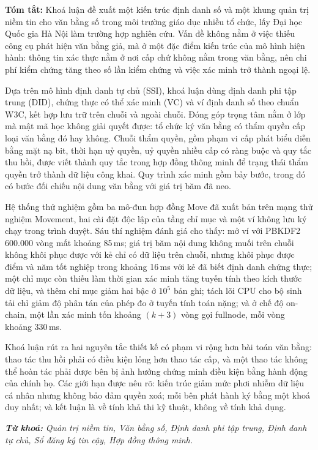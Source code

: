 
{\fsize{12pt}
\textbf{Tóm tắt:} Khoá luận đề xuất một kiến trúc định danh số và một khung quản trị niềm tin cho văn bằng số trong môi trường giáo dục nhiều tổ chức, lấy Đại học Quốc gia Hà Nội làm trường hợp nghiên cứu. Vấn đề không nằm ở việc thiếu công cụ phát hiện văn bằng giả, mà ở một đặc điểm kiến trúc của mô hình hiện hành: thông tin xác thực nằm ở nơi cấp chứ không nằm trong văn bằng, nên chi phí kiểm chứng tăng theo số lần kiểm chứng và việc xác minh trở thành ngoại lệ.

Dựa trên mô hình định danh tự chủ (SSI), khoá luận dùng định danh phi tập trung (DID), chứng thực có thể xác minh (VC) và ví định danh số theo chuẩn W3C, kết hợp lưu trữ trên chuỗi và ngoài chuỗi. Đóng góp trọng tâm nằm ở lớp mà mật mã học không giải quyết được: tổ chức ký văn bằng có thẩm quyền cấp loại văn bằng đó hay không. Chuỗi thẩm quyền, gồm phạm vi cấp phát biểu diễn bằng mặt nạ bit, thời hạn uỷ quyền, uỷ quyền nhiều cấp có ràng buộc và quy tắc thu hồi, được viết thành quy tắc trong hợp đồng thông minh để trạng thái thẩm quyền trở thành dữ liệu công khai. Quy trình xác minh gồm bảy bước, trong đó có bước đối chiếu nội dung văn bằng với giá trị băm đã neo.

Hệ thống thử nghiệm gồm ba mô-đun hợp đồng Move đã xuất bản trên mạng thử nghiệm Movement, hai cài đặt độc lập của tầng chỉ mục và một ví không lưu ký chạy trong trình duyệt. Sáu thí nghiệm đánh giá cho thấy: mở ví với PBKDF2 600.000 vòng mất khoảng 85\,ms; giá trị băm nội dung không muối trên chuỗi không khôi phục được với kẻ chỉ có dữ liệu trên chuỗi, nhưng khôi phục được điểm và năm tốt nghiệp trong khoảng 16\,ms với kẻ đã biết định danh chứng thực; một chỉ mục còn thiếu làm thời gian xác minh tăng tuyến tính theo kích thước dữ liệu, và thêm chỉ mục giảm hai bậc ở $10^5$ bản ghi; tách lõi CPU cho bộ sinh tải chỉ giảm độ phân tán của phép đo ở tuyến tính toán nặng; và ở chế độ on-chain, một lần xác minh tốn khoảng $(k+3)$ vòng gọi fullnode, mỗi vòng khoảng 330\,ms.

Khoá luận rút ra hai nguyên tắc thiết kế có phạm vi rộng hơn bài toán văn bằng: thao tác thu hồi phải có điều kiện lỏng hơn thao tác cấp, và một thao tác không thể hoàn tác phải được bên bị ảnh hưởng chứng minh điều kiện bằng hành động của chính họ. Các giới hạn được nêu rõ: kiến trúc giảm mức phơi nhiễm dữ liệu cá nhân nhưng không bảo đảm quyền xoá; mỗi bên phát hành ký bằng một khoá duy nhất; và kết luận là về tính khả thi kỹ thuật, không về tính khả dụng.

\vspace{0.5cm}
\textit{\textbf{Từ khoá:}} \textit{Quản trị niềm tin, Văn bằng số, Định danh phi tập trung, Định danh tự chủ, Sổ đăng ký tin cậy, Hợp đồng thông minh.}
}
